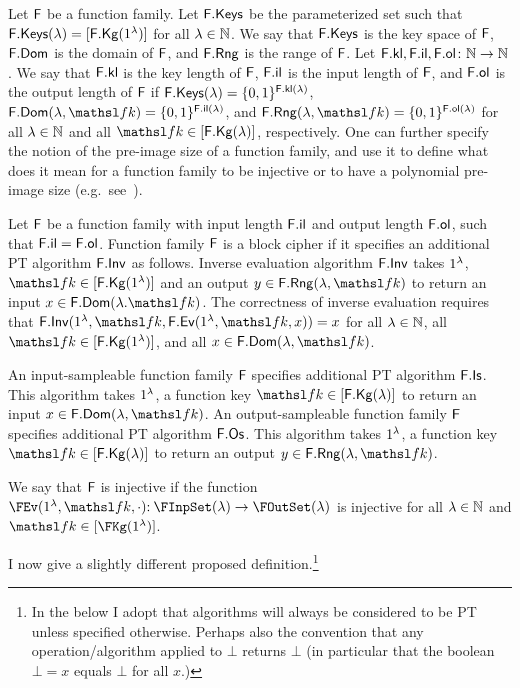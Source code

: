Let $\mathsf{F}$ be a function family.
Let $\mathsf{F}.\mathsf{Keys}$ be the parameterized set such that $\mathsf{F}.\mathsf{Keys}(\lambda) = [\mathsf{F}.\mathsf{Kg}(1^\lambda)]$ for all $\lambda\in{{\mathbb N}}$.
We say that $\mathsf{F}.\mathsf{Keys}$ is the key space of $\mathsf{F}$, $\mathsf{F}.\mathsf{Dom}$ is the domain of $\mathsf{F}$, and $\mathsf{F}.\mathsf{Rng}$ is the range of $\mathsf{F}$.
Let $\mathsf{F}.\mathsf{kl},\mathsf{F}.\mathsf{il},\mathsf{F}.\mathsf{ol}\colon{{\mathbb N}}\to{{\mathbb N}}$. 
We say that $\mathsf{F}.\mathsf{kl}$ is the key length of $\mathsf{F}$, $\mathsf{F}.\mathsf{il}$ is the input length of $\mathsf{F}$, and $\mathsf{F}.\mathsf{ol}$ is the output length of $\mathsf{F}$ if $\mathsf{F}.\mathsf{Keys}(\lambda) = \{0,1\}^{\mathsf{F}.\mathsf{kl}(\lambda)}$, $\Dom{\FF}(\secParam,\FKey) = \bits^{\il{\FF}(\secParam)}$, and $\Rng{\FF}(\secParam, \FKey) = \bits^{\ol{\FF}(\secParam)}$ for all $\lambda\in{{\mathbb N}}$ and all $\FKey\in[\Kg{\FF}(\secParam)]$, respectively.
One can further specify the notion of the pre-image size of a function family, and use it to define what does it mean for a function family to be injective or to have a polynomial pre-image size (e.g.~see~\cite{AC:BelSteTes14}).

Let $\mathsf{F}$ be a function family with input length $\mathsf{F}.\mathsf{il}$ and output length $\mathsf{F}.\mathsf{ol}$, such that $\mathsf{F}.\mathsf{il}=\mathsf{F}.\mathsf{ol}$.
Function family $\mathsf{F}$ is a block cipher if it specifies an additional PT algorithm $\mathsf{F}.\mathsf{Inv}$ as follows.
Inverse evaluation algorithm $\mathsf{F}.\mathsf{Inv}$ takes $1^\lambda$, $\FKey\in[\Kg{\FF}(\secIn)]$ and an output $y\in\Rng{\FF}(\secParam, \FKey)$ to return an input $x\in\Dom{\FF}(\secParam. \FKey)$.
The correctness of inverse evaluation requires that $\Inv{\FF}(\secIn, \FKey, \Ev{\FF}(\secIn, \FKey, x)) = x$ for all $\lambda\in{{\mathbb N}}$, all $\FKey\in[\Kg{\FF}(\secIn)]$, and all $x\in\Dom{\FF}(\secParam, \FKey)$.

\iffalse
{}
An input-sampleable function family $\mathsf{F}$ specifies additional PT algorithm $\mathsf{F}.\mathsf{Is}$.
This algorithm takes $1^\lambda$, a function key $\FKey\in[\Kg{\FF}(\secParam)]$ to return an input $x\in\Dom{\FF}(\secParam,\FKey)$.
An output-sampleable function family $\mathsf{F}$ specifies additional PT algorithm $\mathsf{F}.\mathsf{Os}$.
This algorithm takes $1^\lambda$, a function key $\FKey\in[\Kg{\FF}(\secParam)]$ to return an output $y\in\Rng{\FF}(\secParam,\FKey)$.


We say that $\mathsf{F}$ is injective if the function $\FEv(\secIn,\FKey,\cdot)\Colon\FInpSet(\secParam)\to\FOutSet(\secParam)$ is injective for all $\lambda\in{{\mathbb N}}$ and $\FKey\in [\FKg(\secIn)]$.
	
I now give a slightly different proposed definition.\footnote{In the below I adopt that algorithms will always be considered to be PT unless specified otherwise.
Perhaps also the convention that any operation/algorithm applied to $\bot$ returns $\bot$ (in particular that the boolean $\bot=x$ equals $\bot$ for all $x$.)}

